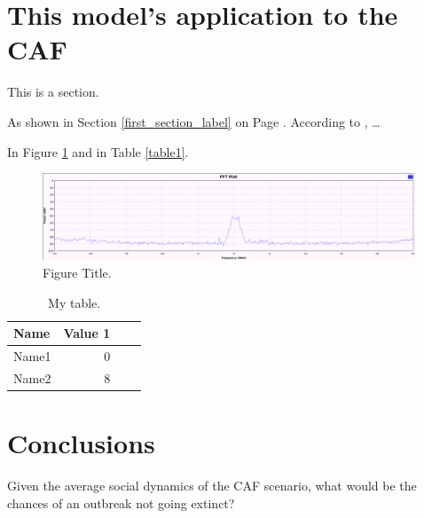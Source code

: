 \documentclass[sr]{drdc-report}
\begin{document}
\section{This model's application to the CAF}\label{CAF_Application_section_label}
This is a section.

As shown in Section \ref{first_section_label} on Page \pageref{first_section_label}.
According to \cite{archana_lucas_report}, \ldots

In Figure \ref{spectrum} and in Table \ref{table1}.

\begin{figure}
  \includegraphics[width=0.99\textwidth, keepaspectratio=true]{figures/spectrum}
  \caption{Figure Title.}\label{spectrum}
\end{figure}

\clearpage

\begin{table}
\centering
\caption{My table.}\label{table2}
\begin{tabular}{lrrl}
Name & Value 1 \\
\hline
\hline
Name1 & 0 \\
Name2 & 8 \\
\hline
\end{tabular}
\end{table}


\section{Conclusions}\label{Conclusions_section_label}
Given the average social dynamics of the CAF scenario, what would be the chances of an outbreak not going extinct?




\docctl

\end{document}
